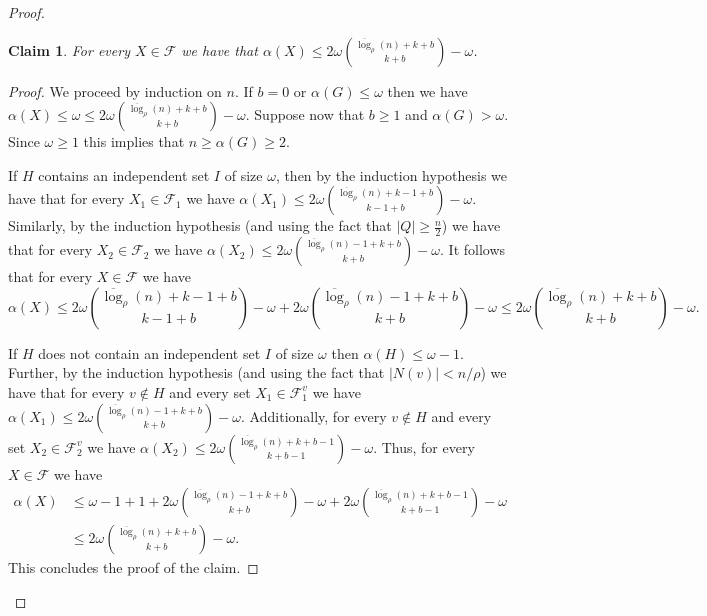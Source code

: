 \documentclass[11pt]{amsart}
\newtheorem{claim}{Claim}[theorem]
\newcommand{\cal}{\mathcal}
\newcounter{tbox}
\newcommand{\sta}[1]{\vspace*{0.3cm}\refstepcounter{tbox}\noindent{ \parbox{\textwidth}{(\thetbox) \emph{#1}}}\vspace*{0.3cm}}
\begin{document}
\begin{proof}
\begin{claim}\label{clm:alphaBound1}
For every $X \in {\cal F}$ we have that $\alpha(X) \leq 2\omega {\overline{\log}_\rho(n) + k+b \choose k+b} - \omega$.
\end{claim}

\begin{proof}
We proceed by induction on $n$. If $b=0$ or $\alpha(G) \leq \omega$ then we have $\alpha(X) \leq \omega \leq 2\omega {\overline{\log}_\rho(n) + k+b \choose k+b} - \omega$. Suppose now that $b \geq 1$ and $\alpha(G) > \omega$. Since $\omega \geq 1$ this implies that $n \geq \alpha(G) \geq 2$. 

If $H$ contains an independent set $I$ of size $\omega$, then by the induction hypothesis we have that for every $X_1 \in {\cal F}_1$ we have $\alpha(X_1) \leq 2\omega {\overline{\log}_\rho(n) + k-1+b \choose k-1+b} - \omega$.
%
Similarly, by the induction hypothesis (and using the fact that $|Q| \geq \frac{n}{2}$) we have that for every $X_2 \in {\cal F}_2$ we have 
$\alpha(X_2) \leq 2\omega {\overline{\log}_\rho(n)-1 + k+b \choose k+b} - \omega$.
%
It follows that for every $X \in {\cal F}$  we have 
$$\alpha(X) \leq 
2\omega {\overline{\log}_\rho(n) + k-1+b \choose k-1+b} - \omega +
2\omega {\overline{\log}_\rho(n)-1 + k+b \choose k+b} - \omega
\leq
2\omega {\overline{\log}_\rho(n) + k+b \choose k+b} - \omega.
$$

If $H$ does not contain an independent set $I$ of size $\omega$ then $\alpha(H) \leq \omega - 1$. 
%
Further, by the induction hypothesis (and using the fact that $|N(v)| < n/\rho$) we have that for every $v \notin H$ and every set $X_1 \in {\cal F}_1^v$ we have 
$\alpha(X_1) \leq 2\omega {\overline{\log}_\rho(n) - 1 + k+b \choose k+b} - \omega$. Additionally, for every $v \notin H$ and every set $X_2 \in {\cal F}_2^v$ we have $\alpha(X_2) \leq 2\omega {\overline{\log}_\rho(n) + k+b-1 \choose k+b-1} - \omega$. Thus, for every $X \in {\cal F}$  we have 
\begin{align*}
\alpha(X) & \leq \omega - 1 + 1 + 2\omega {\overline{\log}_\rho(n) - 1 + k+b \choose k+b} - \omega + 2\omega {\overline{\log}_\rho(n) + k+b-1 \choose k+b-1} - \omega \\
& \leq 2\omega {\overline{\log}_\rho(n) + k+b \choose k+b} - \omega \mbox{.}
\end{align*}
%
This concludes the proof of the claim.
\end{proof}


\end{proof}
\end{document}
